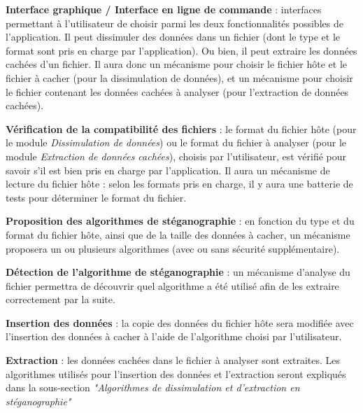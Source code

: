 \documentclass[11pt]{article}
\begin{document}
\begin{description}
\small
\item[a)] \textbf{Interface graphique / Interface en ligne de commande} :
    interfaces permettant à l'utilisateur de choisir parmi les deux
    fonctionnalités possibles de l'application. Il peut dissimuler des
    données dans un fichier (dont le type et le format sont pris en charge
    par l'application). Ou bien, il peut extraire les données cachées d'un
    fichier. \newline
    Il aura donc un mécanisme pour choisir le fichier hôte et le fichier 
    à cacher (pour la dissimulation de données), et un mécanisme pour choisir le 
    fichier contenant les données cachées à analyser (pour l'extraction de 
    données cachées). 
    

\item[b)] \textbf{Vérification de la compatibilité des fichiers} : le format 
	du fichier hôte (pour le module \textit{Dissimulation de données}) ou 
	le format du fichier à analyser (pour le module \textit{Extraction de données 
	cachées}), choisis par l'utilisateur, est vérifié pour savoir s'il est 
	bien pris en charge par l'application. \newline
	Il aura un mécanisme de lecture du fichier hôte : selon les formats 
	pris en charge, il y aura une batterie de tests pour déterminer le 
	format du fichier. 

\item[c)] \textbf{Proposition des algorithmes de stéganographie} : en fonction
    du type et du format du fichier hôte, ainsi que de la taille des données à
    cacher, un mécanisme proposera un ou plusieurs algorithmes (avec ou sans 
    sécurité supplémentaire). 

\item[d)] \textbf{Détection de l'algorithme de stéganographie} : un mécanisme 
	d'analyse du fichier permettra de découvrir quel algorithme a été utilisé 
	afin de les extraire correctement par la suite. 

\item[e)] \textbf{Insertion des données} : la copie des données du fichier hôte
    sera modifiée avec l'insertion des données à cacher à l'aide de l'algorithme
    choisi par l'utilisateur. 

\item[f)] \textbf{Extraction} : les données cachées dans le fichier à analyser
    sont extraites. Les algorithmes utilisés pour l'insertion des données 
    et l'extraction seront expliqués dans la sous-section \textit{"Algorithmes 
    de dissimulation et d'extraction en stéganographie"}

\end{description}
\end{document}
